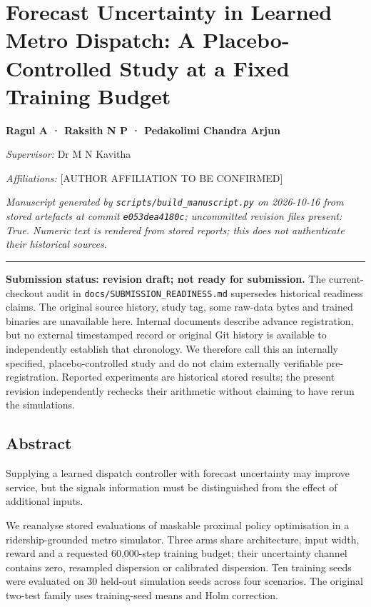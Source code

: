 \documentclass[
]{article}
\author{}
\date{}
\begin{document}
\section{Forecast Uncertainty in Learned Metro Dispatch: A
Placebo-Controlled Study at a Fixed Training
Budget}\label{forecast-uncertainty-in-learned-metro-dispatch-a-placebo-controlled-study-at-a-fixed-training-budget}

\textbf{Ragul A · Raksith N P · Pedakolimi Chandra Arjun}

\emph{Supervisor:} Dr M N Kavitha

\emph{Affiliations:} {[}AUTHOR AFFILIATION TO BE CONFIRMED{]}

\emph{Manuscript generated by \texttt{scripts/build\_manuscript.py} on
2026-10-16 from stored artefacts at commit \texttt{e053dea4180c};
uncommitted revision files present: True. Numeric text is rendered from
stored reports; this does not authenticate their historical sources.}

\begin{center}\rule{0.5\linewidth}{0.5pt}\end{center}

\textbf{Submission status: revision draft; not ready for submission.}
The current-checkout audit in \texttt{docs/SUBMISSION\_READINESS.md}
supersedes historical readiness claims. The original source history,
study tag, some raw-data bytes and trained binaries are unavailable
here. Internal documents describe advance registration, but no external
timestamped record or original Git history is available to independently
establish that chronology. We therefore call this an internally
specified, placebo-controlled study and do not claim externally
verifiable pre-registration. Reported experiments are historical stored
results; the present revision independently rechecks their arithmetic
without claiming to have rerun the simulations.

\subsection{Abstract}\label{abstract}

Supplying a learned dispatch controller with forecast uncertainty may
improve service, but the signal\textquotesingle s information must be
distinguished from the effect of additional inputs.

We reanalyse stored evaluations of maskable proximal policy optimisation
in a ridership-grounded metro simulator. Three arms share architecture,
input width, reward and a requested 60,000-step training budget; their
uncertainty channel contains zero, resampled dispersion or calibrated
dispersion. Ten training seeds were evaluated on 30 held-out simulation
seeds across four scenarios. The original two-test family uses
training-seed means and Holm correction.
\end{document}
